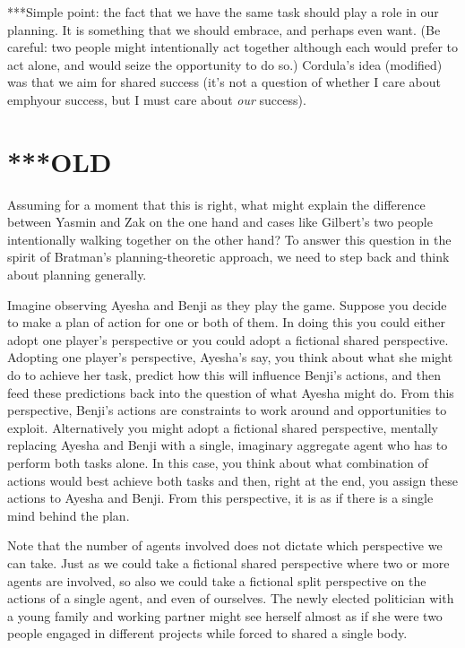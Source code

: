 \documentclass[12pt,\papersize]{extarticle}
\begin{document}
***Simple point: the fact that we have the same task should play a role in our planning.  It is something that we should embrace, and perhaps even want.  (Be careful: two people might intentionally act together although each would prefer to act alone, and would seize the opportunity to do so.)  Cordula's idea (modified) was that we aim for shared success (it's not a question of whether I care about \\emph{your} success, but I must care about \emph{our} success).



\section{***OLD}
Assuming for a moment that this is right,
what might explain the difference between Yasmin and Zak on the one hand and cases like Gilbert's two people intentionally walking together on the other hand?
To answer this question in the spirit of Bratman's planning-theoretic approach, we need to step back and think about planning generally.


Imagine observing Ayesha and Benji as they play the game. 
Suppose you decide to make a plan of action for one or both of them.
In doing this you could either adopt one player's perspective or you could adopt a fictional shared perspective.
Adopting one player's perspective, Ayesha's say, 
	you think about what she might do to achieve her task,
	predict how this will influence Benji's actions,
	and then feed  these predictions back into the question of what Ayesha might do.
From this perspective, Benji's actions are constraints to work around and opportunities to exploit.
Alternatively you might adopt a fictional shared perspective, 
	 mentally replacing Ayesha and Benji with a single, imaginary aggregate agent who has to perform both tasks alone.
	 In this case, you think about what combination of actions would best achieve both tasks and then, right at the end, you assign these actions to Ayesha and Benji.
From this perspective, it is as if there is a single mind behind the plan.

Note that the number of agents involved does not dictate which perspective we can take.
Just as we could take a fictional shared perspective where two or more agents are involved, 
so also we could take a fictional split perspective on the actions of  a single agent, and even of ourselves.
The newly elected  politician with a young family and working partner might see herself almost as if she were two people engaged in different projects while forced to shared a single body. 
\end{document}
